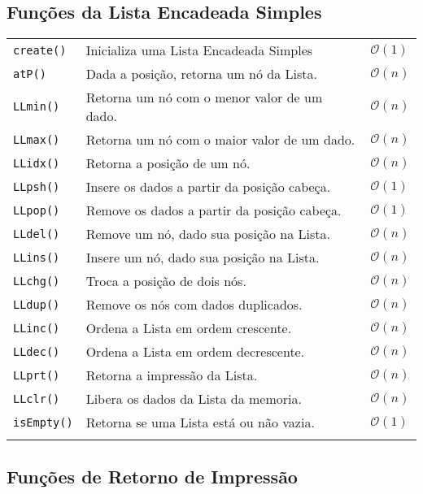 \documentclass[12pt,a4paper]{article}
\begin{document}
\subsection{Funções da Lista Encadeada Simples}

\begin{longtable}{p{3cm} p{11cm} p{1cm}}
	\texttt{create()} & Inicializa uma Lista Encadeada Simples & $\mathcal{O}(1)$ \\
	\texttt{atP()} & Dada a posição, retorna um nó da Lista. & $\mathcal{O}(n)$ \\
	\texttt{LLmin()} & Retorna um nó com o menor valor de um dado. & $\mathcal{O}(n)$ \\
	\texttt{LLmax()} & Retorna um nó com o maior valor de um dado. & $\mathcal{O}(n)$ \\
	\texttt{LLidx()} & Retorna a posição de um nó. & $\mathcal{O}(n)$ \\
	\texttt{LLpsh()} & Insere os dados a partir da posição cabeça. & $\mathcal{O}(1)$ \\
	\texttt{LLpop()} & Remove os dados a partir da posição cabeça. & $\mathcal{O}(1)$ \\
	\texttt{LLdel()} & Remove um nó, dado sua posição na Lista. & $\mathcal{O}(n)$ \\
	\texttt{LLins()} & Insere um nó, dado sua posição na Lista. & $\mathcal{O}(n)$ \\
	\texttt{LLchg()} & Troca a posição de dois nós. & $\mathcal{O}(n)$ \\
	\texttt{LLdup()} & Remove os nós com dados duplicados. & $\mathcal{O}(n)$ \\
	\texttt{LLinc()} & Ordena a Lista em ordem crescente. & $\mathcal{O}(n)$ \\
	\texttt{LLdec()} & Ordena a Lista em ordem decrescente. & $\mathcal{O}(n)$ \\
	\texttt{LLprt()} & Retorna a impressão da Lista. & $\mathcal{O}(n)$ \\
	\texttt{LLclr()} & Libera os dados da Lista da memoria. & $\mathcal{O}(n)$ \\
	\texttt{isEmpty()} & Retorna se uma Lista está ou não vazia. & $\mathcal{O}(1)$ \\
	\label{tab:lista}
\end{longtable}
\vspace{-0.5cm}

\subsection{Funções de Retorno de Impressão}
	
\end{document}

